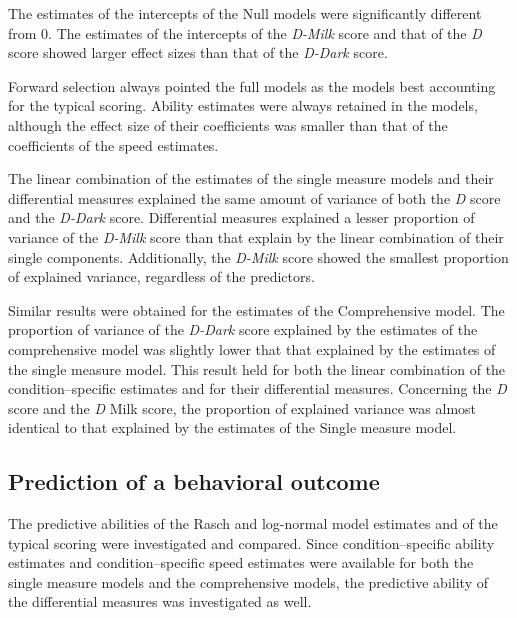 \documentclass[12pt]{book}
\begin{document}
The estimates of the intercepts of the Null models were significantly different from 0. The estimates of the intercepts of the \emph{D-Milk} score and that of the \emph{D} score showed larger effect sizes than that of the \emph{D-Dark} score. 

Forward selection always pointed the full models as the models best accounting for the typical scoring. Ability estimates were always retained in the models, although the effect size of their coefficients was smaller than that of the coefficients of the speed estimates.

The linear combination of the estimates of the single measure models and their differential measures explained the same amount of variance of both the \emph{D} score and the \emph{D-Dark} score. 
Differential measures explained a lesser proportion of variance of the \emph{D-Milk} score than that explain by the linear combination of their single components. Additionally, the \emph{D-Milk} score showed the smallest proportion of explained variance, regardless of the predictors.

Similar results were obtained for the estimates of the Comprehensive model. 
The proportion of variance of the \emph{D-Dark} score explained by the estimates of the comprehensive model was slightly lower that that explained by the estimates of the single measure model. This result held for both the linear combination of the condition--specific estimates and for their differential measures.
Concerning the \emph{D} score and the \emph{D} Milk score, the proportion of explained variance was almost identical to that explained by the estimates of the Single measure model.

\subsection{Prediction of a behavioral outcome}

The predictive abilities of the Rasch and log-normal model estimates and of the typical scoring were investigated and compared. 
Since condition--specific ability estimates and condition--specific speed estimates were available for both the single measure models and the comprehensive models, the predictive ability of the differential measures was investigated as well. 
\end{document}

